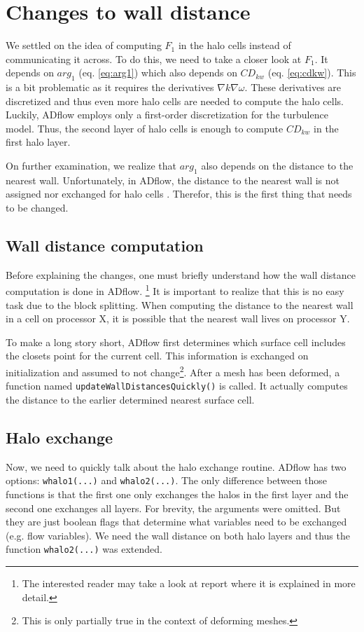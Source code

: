 \section{Changes to wall distance}
We settled on the idea of computing $F_1$ in the halo cells instead of
communicating it across. To do this, we need to take a closer look at $F_1$. It
depends on $arg_1$ (eq. \ref{eq:arg1}) which also depends on $CD_{kw}$ (eq.
\ref{eq:cdkw}). This is a bit problematic as it requires the derivatives
$\nabla k \nabla \omega$. These derivatives are discretized and thus even
more halo cells are needed to compute the halo cells. Luckily, ADflow employs
only a first-order discretization for the turbulence model. Thus, the second
layer of halo cells is enough to compute $CD_{kw}$ in the first halo layer.

On further examination, we realize that $arg_1$ also depends on the distance to
the nearest wall. Unfortunately, in ADflow, the distance to the nearest wall is
not assigned nor exchanged for halo cells . Therefor, this is the first thing
that needs to be changed.




\subsection{Wall distance computation}
Before explaining the changes, one must briefly understand how the wall
distance computation is done in ADflow. \footnote{The interested reader may
take a look at report \cite{vt1} where it is explained in more detail.} It is
important to realize that this is no easy task due to the block splitting. When
computing the distance to the nearest wall in a cell on processor X, it is
possible that the nearest wall lives on processor Y. 

To make a long story short, ADflow first determines which surface cell includes
the closets point for the current cell. This information is exchanged on
initialization and assumed to not change\footnote{This is only partially true
in the context of deforming meshes.}. After a mesh has been deformed, a
function named \texttt{updateWallDistancesQuickly()} is called. It actually
computes the distance to the earlier determined nearest surface cell.




\subsection{Halo exchange}
Now, we need to quickly talk about the halo exchange routine. ADflow has two
options: \texttt{whalo1(...)} and \texttt{whalo2(...)}. The only difference
between those functions is that the first one only exchanges the halos in the
first layer and the second one exchanges all layers. For brevity, the arguments
were omitted. But they are just boolean flags that determine what variables
need to be exchanged (e.g. flow variables). We need the wall distance on both
halo layers and thus the function \texttt{whalo2(...)} was extended.

